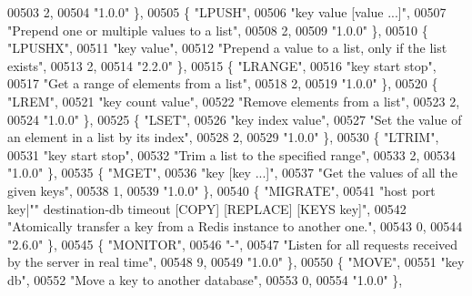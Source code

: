 \begin{DoxyCode}
00503     2,
00504     \textcolor{stringliteral}{"1.0.0"} \},
00505     \{ \textcolor{stringliteral}{"LPUSH"},
00506     \textcolor{stringliteral}{"key value [value ...]"},
00507     \textcolor{stringliteral}{"Prepend one or multiple values to a list"},
00508     2,
00509     \textcolor{stringliteral}{"1.0.0"} \},
00510     \{ \textcolor{stringliteral}{"LPUSHX"},
00511     \textcolor{stringliteral}{"key value"},
00512     \textcolor{stringliteral}{"Prepend a value to a list, only if the list exists"},
00513     2,
00514     \textcolor{stringliteral}{"2.2.0"} \},
00515     \{ \textcolor{stringliteral}{"LRANGE"},
00516     \textcolor{stringliteral}{"key start stop"},
00517     \textcolor{stringliteral}{"Get a range of elements from a list"},
00518     2,
00519     \textcolor{stringliteral}{"1.0.0"} \},
00520     \{ \textcolor{stringliteral}{"LREM"},
00521     \textcolor{stringliteral}{"key count value"},
00522     \textcolor{stringliteral}{"Remove elements from a list"},
00523     2,
00524     \textcolor{stringliteral}{"1.0.0"} \},
00525     \{ \textcolor{stringliteral}{"LSET"},
00526     \textcolor{stringliteral}{"key index value"},
00527     \textcolor{stringliteral}{"Set the value of an element in a list by its index"},
00528     2,
00529     \textcolor{stringliteral}{"1.0.0"} \},
00530     \{ \textcolor{stringliteral}{"LTRIM"},
00531     \textcolor{stringliteral}{"key start stop"},
00532     \textcolor{stringliteral}{"Trim a list to the specified range"},
00533     2,
00534     \textcolor{stringliteral}{"1.0.0"} \},
00535     \{ \textcolor{stringliteral}{"MGET"},
00536     \textcolor{stringliteral}{"key [key ...]"},
00537     \textcolor{stringliteral}{"Get the values of all the given keys"},
00538     1,
00539     \textcolor{stringliteral}{"1.0.0"} \},
00540     \{ \textcolor{stringliteral}{"MIGRATE"},
00541     \textcolor{stringliteral}{"host port key|"}\textcolor{stringliteral}{" destination-db timeout [COPY] [REPLACE] [KEYS key]"},
00542     \textcolor{stringliteral}{"Atomically transfer a key from a Redis instance to another one."},
00543     0,
00544     \textcolor{stringliteral}{"2.6.0"} \},
00545     \{ \textcolor{stringliteral}{"MONITOR"},
00546     \textcolor{stringliteral}{"-"},
00547     \textcolor{stringliteral}{"Listen for all requests received by the server in real time"},
00548     9,
00549     \textcolor{stringliteral}{"1.0.0"} \},
00550     \{ \textcolor{stringliteral}{"MOVE"},
00551     \textcolor{stringliteral}{"key db"},
00552     \textcolor{stringliteral}{"Move a key to another database"},
00553     0,
00554     \textcolor{stringliteral}{"1.0.0"} \},

\end{DoxyCode}
